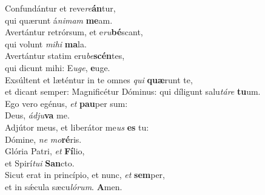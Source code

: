 \evenverse Confundántur et reve\textit{re}\textbf{án}tur,~\*\\
\evenverse qui quærunt á\textit{ni}\textit{mam} \textbf{me}am.\\
\oddverse Avertántur retrórsum, et e\textit{ru}\textbf{bé}scant,~\*\\
\oddverse qui volunt \textit{mi}\textit{hi} \textbf{ma}la.\\
\evenverse Avertántur statim eru\textit{be}\textbf{scén}tes,~\*\\
\evenverse qui dicunt mihi: E\textit{u}\textit{ge}, \textbf{e}uge.\\
\oddverse Exsúltent et læténtur in te omnes \textit{qui} \textbf{quæ}runt te,~\*\\
\oddverse et dicant semper: Magnificétur Dóminus: qui díligunt salu\textit{tá}\textit{re} \textbf{tu}um.\\
\evenverse Ego vero egénus, \textit{et} \textbf{pau}per sum:~\*\\
\evenverse Deus, \textit{ád}\textit{ju}\textbf{va} me.\\
\oddverse Adjútor meus, et liberátor me\textit{us} \textbf{es} tu:~\*\\
\oddverse Dómine, \textit{ne} \textit{mo}\textbf{ré}ris.\\
\evenverse Glória Patri, \textit{et} \textbf{Fí}lio,~\*\\
\evenverse et Spirí\textit{tu}\textit{i} \textbf{San}cto.\\
\oddverse Sicut erat in princípio, et nunc, \textit{et} \textbf{sem}per,~\*\\
\oddverse et in sǽcula sæcu\textit{ló}\textit{rum}. \textbf{A}men.\\
